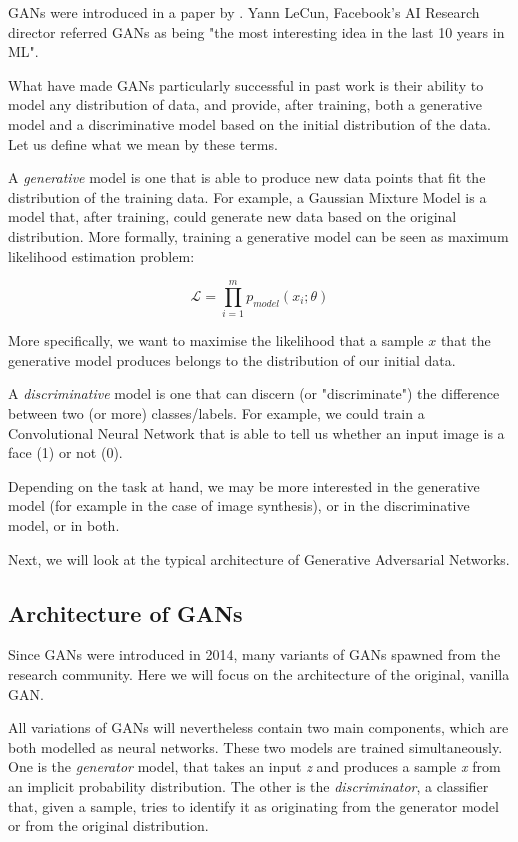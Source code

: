 GANs were introduced in a paper by \cite{goodfellow2014generative}. Yann LeCun, Facebook's AI Research director referred GANs as being "the most interesting idea in the last 10 years in ML".

What have made GANs particularly successful in past work is their ability to model any distribution of data, and provide, after training, both a generative model and a discriminative model based on the initial distribution of the data. Let us define what we mean by these terms.

A \textit{generative} model is one that is able to produce new data points that fit the distribution of the training data. For example, a Gaussian Mixture Model is a model that, after training, could generate new data based on the original distribution. More formally, training a generative model can be seen as maximum likelihood estimation problem:

\[\mathscr{L} = \prod_{i=1}^{m} p_{model}(x_i;\theta)\]

More specifically, we want to maximise the likelihood that a sample $x$ that the generative model produces belongs to the distribution of our initial data.

A \textit{discriminative} model is one that can discern (or "discriminate") the difference between two (or more) classes/labels. For example, we could train a Convolutional Neural Network that is able to tell us whether an input image is a face (1) or not (0).

Depending on the task at hand, we may be more interested in the generative model (for example in the case of image synthesis), or in the discriminative model, or in both.

Next, we will look at the typical architecture of Generative Adversarial Networks.

\subsection{Architecture of GANs}
Since GANs were introduced in 2014, many variants of GANs spawned from the research community. Here we will focus on the architecture of the original, vanilla GAN.

All variations of GANs will nevertheless contain two main components, which are both modelled as neural networks. These two models are trained simultaneously. One is the \emph{generator} model, that takes an input \emph{z} and produces a sample \emph{x} from an implicit probability distribution. The other is the \emph{discriminator}, a classifier that, given a sample, tries to identify it as originating from the generator model or from the original distribution.

